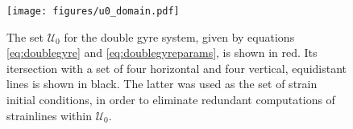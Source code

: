 \begin{figure}[htpb]
    \centering
    \texttt{[image: figures/u0\_domain.pdf]}
    \caption[The set $\mathcal{U}_{0}$ for the double gyre system]{The set
    $\mathcal{U}_{0}$ for the double gyre system, given by equations
    \eqref{eq:doublegyre} and \eqref{eq:doublegyreparams}, is shown in red. Its
    itersection with a set of four horizontal and four vertical, equidistant
    lines is shown in black. The latter was used as the set of strain initial
    conditions, in order to eliminate redundant computations of strainlines
    within $\mathcal{U}_{0}$.}
    \label{fig:u0_domain}
\end{figure}
